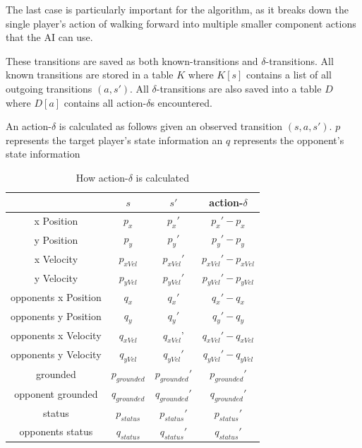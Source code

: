 The last case is particularly important for the algorithm, as it breaks down the single player's action of walking forward into multiple smaller component actions that the AI can use.

These transitions are saved as both known-transitions and $\delta$-transitions. All known transitions are stored in a table $K$ where $K[s]$ contains a list of all outgoing transitions $(a,s')$. All $\delta$-transitions are also saved into a table $D$ where $D[a]$ contains all action-$\delta$s encountered. 

An action-$\delta$ is calculated as follows given an observed transition $(s, a, s')$. $p$ represents the target player's state information an $q$ represents the opponent's state information

\begin{table}[h]
	\centering
	\caption{How action-$\delta$ is calculated}
	\begin{tabular}{| c | c | c | c |}
		\hline
		 & $s$ & $s'$ & action-$\delta$ \\
		\hline
		x Position        			& $p_{x}$ & $p_{x}'$ & $p_{x}' - p_{x}$ 	\\
		\hline            			
		y Position        			& $p_{y}$ & $p_{y}'$ & $p_{y}' - p_{y}$ 	\\
		\hline            			
		x Velocity        			& $p_{xVel}$ & $p_{xVel}'$ & $p_{xVel}' - p_{xVel}$  \\
		\hline            			
		y Velocity        			& $p_{yVel}$ & $p_{yVel}'$ & $p_{yVel}' - p_{yVel}$	\\
		\hline
		opponents x Position        & $q_{x}$ & $q_{x}'$ & $q_{x}' - q_{x}$	\\
		\hline
		opponents y Position        & $q_{y}$ & $q_{y}'$ & $q_{y}' - q_{y}$ \\
		\hline
		opponents x Velocity        & $q_{xVel}$& $q_{xVel}$' & $q_{xVel}' - q_{xVel}$	\\
		\hline
		opponents y Velocity        & $q_{yVel}$ & $q_{yVel}'$ & $q_{yVel}' - q_{yVel}$	\\
		\hline
		grounded        			& $p_{grounded}$ & $p_{grounded}'$ & $p_{grounded}'$	\\
		\hline
		opponent grounded       	& $q_{grounded}$ & $q_{grounded}'$ & $q_{grounded}'$ 	\\
		\hline
		status       				& $p_{status}$ & $p_{status}'$ & $p_{status}'$ 	\\
		\hline
		opponents status        	& $q_{status}$ & $q_{status}'$ & $q_{status}'$ 	\\
		\hline
	\end{tabular}
	\label{gamestate}
\end{table}

